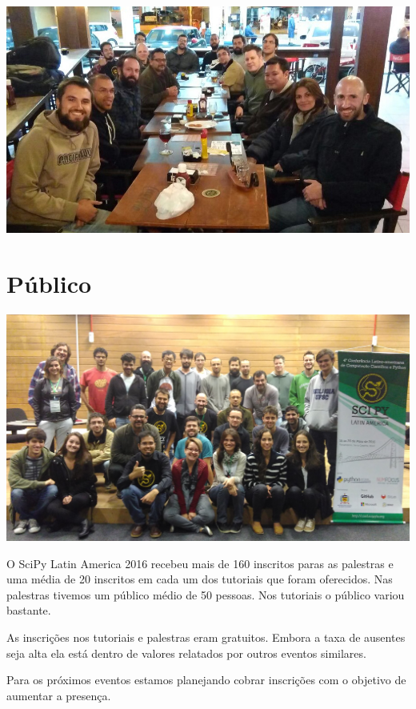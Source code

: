 \documentclass[12pt]{article}
\begin{document}
\noindent  %
\includegraphics[width=\textwidth]{social-viking.jpg}




\newpage

\section*{Público}

\includegraphics[width=\textwidth]{group.jpg}

O SciPy Latin America 2016 recebeu mais de 160 inscritos paras as palestras e
uma média de 20 inscritos em cada um dos tutoriais que foram oferecidos.
Nas palestras tivemos um público médio de 50 pessoas. Nos tutoriais o público
variou bastante.

As inscrições nos tutoriais e palestras eram gratuitos. Embora a taxa de
ausentes seja alta ela está dentro de valores relatados por outros eventos
similares.

Para os próximos eventos estamos planejando cobrar inscrições com o objetivo de
aumentar a presença.
\end{document}
